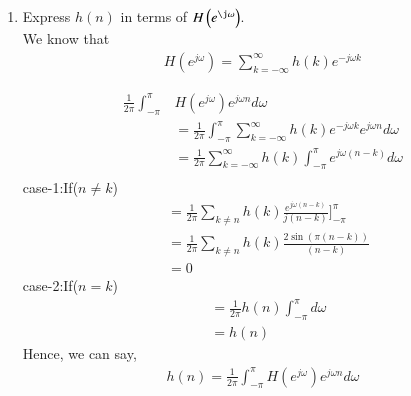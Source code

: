 \documentclass[journal,12pt,twocolumn]{IEEEtran}
\renewcommand\thesection{\arabic{section}}
\begin{document}
\begin{enumerate}[label=\thesection.\arabic*]
\item Express $h(n)$ in terms of $H\brak{e^{\j \omega}}$.\\
\solution We know that 
\begin{align}
	H(e^{j\omega})=\sum_{k=-\infty}^\infty h(k)e^{-j\omega k}
\end{align}

\begin{align}
	\frac{1}{2\pi}\int_{-\pi}^\pi& H(e^{j\omega})e^{j\omega n}d\omega\\
	&=\frac{1}{2\pi}\int_{-\pi}^\pi \sum_{k=-\infty}^\infty h(k)e^{-j\omega k}e^{j\omega n}d\omega\\
	&=\frac{1}{2\pi} \sum_{k=-\infty}^\infty h(k)\int_{-\pi}^\pi e^{j\omega (n-k)}d\omega\\
\end{align}
case-1:If($n\neq k$)
\begin{align}
	&=\frac{1}{2\pi} \sum_{k\neq n} h(k)\frac{e^{j\omega (n-k)}}{j(n-k)}\Biggr] _{-\pi}^\pi \\
	&=\frac{1}{2\pi} \sum_{k\neq n} h(k)\frac{2\sin(\pi(n-k))}{(n-k)}\\
	&=0
\end{align}
case-2:If($n=k$)
\begin{align}
	&=\frac{1}{2\pi}  h(n)\int_{-\pi}^\pi d\omega\\
	&=h(n)
\end{align}
Hence, we can say,
\begin{align}
	h(n)=\frac{1}{2\pi}\int_{-\pi}^\pi H(e^{j\omega})e^{j\omega n}d\omega 
\end{align}
\end{enumerate}
\end{document}
